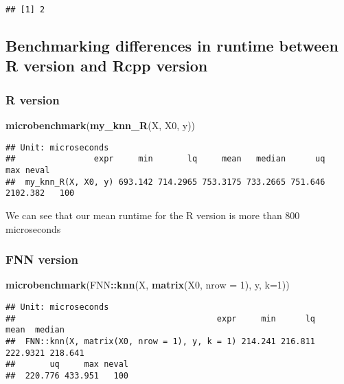 \documentclass[]{article}
\newenvironment{Shaded}{\begin{snugshade}}{\end{snugshade}}
\newcommand{\DataTypeTok}[1]{\textcolor[rgb]{0.13,0.29,0.53}{#1}}
\newcommand{\DecValTok}[1]{\textcolor[rgb]{0.00,0.00,0.81}{#1}}
\newcommand{\KeywordTok}[1]{\textcolor[rgb]{0.13,0.29,0.53}{\textbf{#1}}}
\newcommand{\NormalTok}[1]{#1}
\newcommand{\OperatorTok}[1]{\textcolor[rgb]{0.81,0.36,0.00}{\textbf{#1}}}
\begin{document}
\begin{verbatim}
## [1] 2
\end{verbatim}

\hypertarget{benchmarking-differences-in-runtime-between-r-version-and-rcpp-version}{%
\subsection{Benchmarking differences in runtime between R version and
Rcpp
version}\label{benchmarking-differences-in-runtime-between-r-version-and-rcpp-version}}

\hypertarget{r-version}{%
\subsubsection{R version}\label{r-version}}

\begin{Shaded}
\begin{Highlighting}[]
\KeywordTok{microbenchmark}\NormalTok{(}\KeywordTok{my_knn_R}\NormalTok{(X, X0, y))}
\end{Highlighting}
\end{Shaded}

\begin{verbatim}
## Unit: microseconds
##                expr     min       lq     mean   median      uq      max neval
##  my_knn_R(X, X0, y) 693.142 714.2965 753.3175 733.2665 751.646 2102.382   100
\end{verbatim}

We can see that our mean runtime for the R version is more than 800
microseconds

\hypertarget{fnn-version}{%
\subsubsection{FNN version}\label{fnn-version}}

\begin{Shaded}
\begin{Highlighting}[]
\KeywordTok{microbenchmark}\NormalTok{(FNN}\OperatorTok{::}\KeywordTok{knn}\NormalTok{(X, }\KeywordTok{matrix}\NormalTok{(X0, }\DataTypeTok{nrow =} \DecValTok{1}\NormalTok{), y, }\DataTypeTok{k=}\DecValTok{1}\NormalTok{))}
\end{Highlighting}
\end{Shaded}

\begin{verbatim}
## Unit: microseconds
##                                         expr     min      lq     mean  median
##  FNN::knn(X, matrix(X0, nrow = 1), y, k = 1) 214.241 216.811 222.9321 218.641
##       uq     max neval
##  220.776 433.951   100
\end{verbatim}
\end{document}

